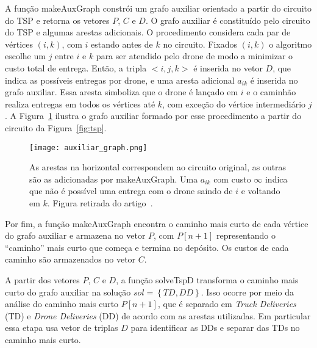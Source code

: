 \documentclass[12pt, a4paper]{article}
\begin{document}
A função makeAuxGraph constrói um grafo auxiliar orientado a partir do circuito do TSP e retorna os vetores $P$, $C$ e $D$. O grafo auxiliar é constituído pelo circuito do TSP e algumas arestas adicionais. %
O procedimento considera cada par de vértices $(i, k)$, com $i$ estando antes de $k$ no circuito. Fixados $(i, k)$ o algoritmo escolhe um $j$ entre $i$ e $k$ para ser atendido pelo drone de modo a minimizar o custo total de entrega. Então, a tripla ${<}i, j, k{>}$ é inserida no vetor $D$, que indica as possíveis entregas por drone, e uma aresta adicional $a_{ik}$ é inserida no grafo auxiliar. Essa aresta simboliza que o drone é lançado em $i$ e o caminhão realiza entregas em todos os vértices até $k$, com exceção do vértice intermediário $j$. A Figura~\ref{fig:aux_graph} ilustra o grafo auxiliar formado por esse procedimento a partir do circuito da Figura~\ref{fig:tsp}.

\begin{figure}[htb!]
\centering
\texttt{[image: auxiliar\_graph.png]}
\caption{As arestas na horizontal correspondem ao circuito original, as outras são as adicionadas por makeAuxGraph. Uma $a_{ik}$ com custo $\infty$ indica que não é possível uma entrega com o drone saindo de $i$ e voltando em $k$. Figura retirada do artigo~\cite{ha2018min}.}
\label{fig:aux_graph}
\end{figure}


Por fim, a função makeAuxGraph encontra o caminho mais curto de cada vértice do grafo auxiliar e armazena no vetor $P$, com $P[n + 1]$ representando o ``caminho'' mais curto que começa e termina no depósito. Os custos de cada caminho são armazenados no vetor $C$.



A partir dos vetores $P$, $C$ e $D$, a função solveTspD transforma o caminho mais curto do grafo auxiliar na solução $sol = \left\{TD, DD\right\}$. Isso ocorre por meio da análise do caminho mais curto $P[n+1]$, que é separado em \textit{Truck Deliveries} (TD) e \textit{Drone Deliveries} (DD) de acordo com as arestas utilizadas. Em particular essa etapa usa vetor de triplas $D$ para identificar as DDs e separar das TDs no caminho mais curto.
\end{document}
